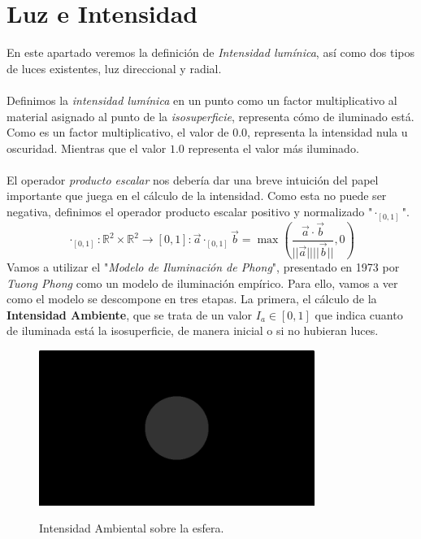 \section{Luz e Intensidad}
En este apartado veremos la definición de \textit{Intensidad lumínica}, así como dos tipos de luces existentes, luz direccional y radial.\\\\
 Definimos la \textit{intensidad lumínica} en un punto como un factor multiplicativo al material asignado al punto de la \textit{isosuperficie}, representa cómo de iluminado está. Como es un factor multiplicativo, el valor de \(0.0\), representa la intensidad nula u oscuridad. Mientras que el valor \(1.0\) representa el valor más iluminado.\\\\ 
El operador \textit{producto escalar} nos debería dar una breve intuición del papel importante que juega en el cálculo de la intensidad. Como esta no puede ser negativa, definimos el operador producto escalar positivo y normalizado "\(\cdot_{[0,1]}\)".
\[\cdot_{[0,1]}:\mathbb{R}^2\times\mathbb{R}^2\longrightarrow[0,1] : \Vec{a}\cdot_{[0,1]}\Vec{b}=\max\left(\dfrac{\Vec{a}\cdot \Vec{b}}{\vert\vert\Vec{a}\vert\vert\vert\vert \Vec{b}\vert\vert}, 0\right)\]
Vamos a utilizar el "\textit{Modelo de Iluminación de Phong}", presentado en 1973 por \textit{Tuong Phong} como un modelo de iluminación empírico. Para ello, vamos a ver como el modelo se descompone en tres etapas. La primera, el cálculo de la \textbf{Intensidad Ambiente}, que se trata de un valor \(I_a \in [0,1]\) que indica cuanto de iluminada está la isosuperficie, de manera inicial o si no hubieran luces. 
\begin{figure}[H]
  \centering
  \captionsetup{justification=centering}%
  \includegraphics[width=0.8\textwidth]{secciones/imagenes/lightmodel/ambiental.png}\label{fig:ambient}
  \caption{Intensidad Ambiental sobre la esfera.}
\end{figure}
